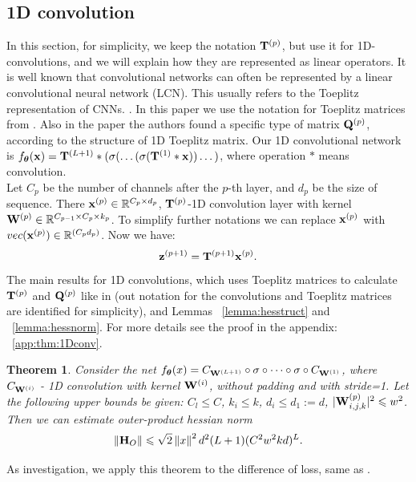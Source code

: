 \documentclass[conference]{IEEEtran}
\newtheorem{theorem}{Theorem}
\begin{document}
\subsection{1D convolution}
In this section, for simplicity, we keep the notation $\mathbf{T}^{(p)}$, but use it for 1D-convolutions, and we will explain how they are represented as linear operators.
It is well known that convolutional networks can often be represented by a linear convolutional neural network (LCN). This usually refers to the Toeplitz representation of CNNs. \cite{kohn2022geometrylinearconvolutionalnetworks, qin2023toeplitzneuralnetworksequence}.
In this paper we use the notation for Toeplitz matrices from \cite{singh2023hessianperspectivenatureconvolutional}.
Also in the paper the authors found a specific type of matrix $\mathbf{Q}^{(p)}$, according to the structure of 1D Toeplitz matrix.
Our 1D convolutional network is $f_{\boldsymbol{\theta}}(\mathbf{x}) = \mathbf{T}^{(L+1)} * (\sigma(\dots (\sigma(\mathbf{T}^{(1)} * \mathbf{x}))\dots)$, where operation $*$ means convolution. \\
Let $C_p$ be the number of channels after the $p$-th layer, and $d_p$ be the size of sequence. There $\mathbf{x}^{(p)} \in \mathbb{R}^{C_p \times d_p}$, $\mathbf{T}^{(p)}$-1D convolution layer with kernel  $\mathbf{W}^{(p)} \in \mathbb{R}^{C_{p-1} \times C_{p} \times k_{p}}$. 
To simplify further notations we can replace 
$\mathbf{x}^{(p)}$ with $vec(\mathbf{x}^{(p)}) \in \mathbb{R}^{(C_pd_p)}$. 
Now we have:
\[\mathbf{z}^{(p+1)} = \mathbf{T}^{(p+1)}\mathbf{x}^{(p)}.\]
The main results for 1D convolutions, which uses Toeplitz matrices to calculate $\mathbf{T}^{(p)}$ and $\mathbf{Q}^{(p)}$ like in \cite{singh2023hessianperspectivenatureconvolutional} (out notation for the convolutions and Toeplitz matrices are identified for simplicity), and Lemmas ~\ref{lemma:hesstruct} and ~\ref{lemma:hessnorm}. For more details see the proof in the appendix: ~\ref{app:thm:1Dconv}.
\begin{theorem}\label{thm:1Dconv}
    Consider the net $f_{\boldsymbol{\theta}}(x) = C_{\mathbf{W}^{(L+1)}} \circ \sigma \circ \dots \circ \sigma \circ C_{\mathbf{W}^{(1)}}$, where $C_{\mathbf{W}^{(i)}}$ - 1D convolution with kernel $\mathbf{W}^{(i)}$, without padding and with stride=1. Let the following upper bounds be given:
     $C_l \leqslant C$,
     $k_i \leqslant k$,
     $d_i \leqslant d_1:=d$,
     $|\mathbf{W}^{(p)}_{i,j,k}|^2 \leqslant w^2$. Then we can estimate outer-product hessian norm\\
    \[\left\|\mathbf{H}_{O}\right\| \leqslant \sqrt{2}\left\|x\right\|^2d^2(L+1)(C^2w^2kd)^L.\]
\end{theorem}
As investigation, we apply this theorem to the difference of loss, same as \cite{kiselev2024unravelinghessiankeysmooth}.
\end{document}
